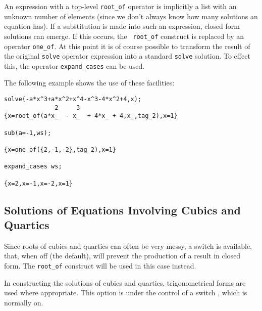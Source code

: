 \hypertarget{operator:ONE_OF}{}
\hypertarget{operator:EXPAND_CASES}{}
An expression with a top-level \texttt{root\_of} operator is implicitly a
list with an unknown number of elements (since we don't always know how
many solutions an equation has).  If a substitution is made into such an
expression, closed form solutions can emerge.  If this occurs, the {\tt
root\_of} construct is replaced by an operator \texttt{one\_of}.
At this point it is of course possible to transform the result of the
original \texttt{solve} operator expression into a standard \texttt{solve}
solution.  To effect this, the operator \texttt{expand\_cases}
 can be used.

The following example shows the use of these facilities:
\begin{verbatim}
solve(-a*x^3+a*x^2+x^4-x^3-4*x^2+4,x);
              2     3
{x=root_of(a*x_  - x_  + 4*x_ + 4,x_,tag_2),x=1}

sub(a=-1,ws);

{x=one_of({2,-1,-2},tag_2),x=1}

expand_cases ws;

{x=2,x=-1,x=-2,x=1}
\end{verbatim}

\subsection{Solutions of Equations Involving Cubics and Quartics}
\hypertarget{switch:FULLROOTS}{}
\hypertarget{switch:TRIGFORM}{}

Since roots of cubics and quartics can often be very messy, a switch
 is available, that, when off (the
default), will prevent the production of a result in closed form.  The
\texttt{root\_of} construct will be used in this case instead.

In constructing the solutions of cubics and quartics, trigonometrical
forms are used where appropriate.  This option is under the control of a
switch , which is normally on.


